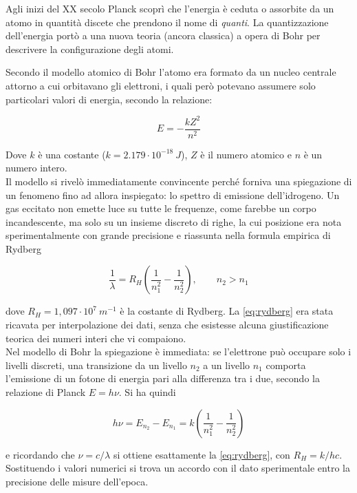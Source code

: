 Agli inizi del XX secolo Planck scoprì che l'energia è ceduta o assorbite da un atomo in quantità discete che prendono il nome di \emph{quanti}. La quantizzazione dell'energia portò a una nuova teoria (ancora classica) a opera di Bohr per descrivere la configurazione degli atomi. 

Secondo il modello atomico di Bohr l'atomo era formato da un nucleo centrale attorno a cui orbitavano gli elettroni, i quali però potevano assumere solo particolari valori di energia, secondo la relazione:

\begin{equation}
    E = - \frac{k Z^2}{n^2}
\end{equation}

Dove $k$ è una costante ($k = 2.179 \cdot 10^{-18} \ J$), $Z$ è il numero atomico e $n$ è un numero intero. \\

Il modello si rivelò immediatamente convincente perché forniva una spiegazione di un fenomeno fino ad allora inspiegato: lo spettro di emissione dell'idrogeno. 
Un gas eccitato non emette luce su tutte le frequenze, come farebbe un corpo incandescente, ma solo su un insieme discreto di righe, la cui posizione era nota sperimentalmente con grande precisione e riassunta nella formula empirica di Rydberg

\begin{equation}
    \frac{1}{\lambda} = R_H \left( \frac{1}{n_1^2} - \frac{1}{n_2^2} \right), \qquad n_2 > n_1
    \label{eq:rydberg}
\end{equation}

dove $R_H = 1,097 \cdot 10^7 \ m^{-1}$ è la costante di Rydberg. La \eqref{eq:rydberg} era stata ricavata per interpolazione dei dati, senza che esistesse alcuna giustificazione teorica dei numeri interi che vi compaiono.\\

Nel modello di Bohr la spiegazione è immediata: se l'elettrone può occupare solo i livelli discreti, una transizione da un livello $n_2$ a un livello $n_1$ comporta l'emissione di un fotone di energia pari alla differenza tra i due, secondo la relazione di Planck $E = h\nu$. Si ha quindi

\begin{equation}
    h \nu = E_{n_2} - E_{n_1} = k \left( \frac{1}{n_1^2} - \frac{1}{n_2^2} \right)
\end{equation}

e ricordando che $\nu = c/\lambda$ si ottiene esattamente la \eqref{eq:rydberg}, con $R_H = k/hc$. Sostituendo i valori numerici si trova un accordo con il dato sperimentale entro la precisione delle misure dell'epoca.\\

